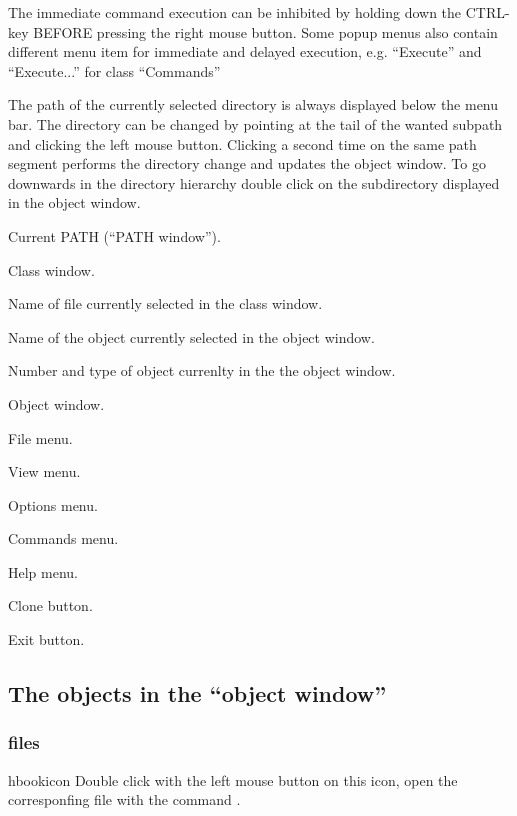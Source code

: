    The immediate command execution can be inhibited by holding down the
   CTRL-key BEFORE pressing the right mouse button.  Some popup menus also
   contain different menu item for immediate and delayed execution, e.g.
   ``Execute'' and ``Execute...'' for class ``Commands''

   The path of the currently selected directory is always displayed below the
   menu bar.  The directory can be changed by pointing at the tail of the
   wanted subpath and clicking the left mouse button.  Clicking a second time
   on the same path segment performs the directory change and updates the
   object window.  To go downwards in the directory hierarchy double click on
   the subdirectory displayed in the object window.


\begin{EnumZB}
\item Current PATH (``PATH window'').
\item Class window.
\item Name of file currently selected in the class window.
\item Name of the object currently selected in the object window.
\item Number and type of object currenlty in the the object window.
\item Object window.
\end{EnumZB}

\begin{EnumZW}
\item File menu.
\item View menu.
\item Options menu.
\item Commands menu.
\item Help menu.
\item Clone button.
\item Exit button.
\end{EnumZW}

\subsection{The objects in the ``object window''}

\subsubsection{\HBOOK{} files}
\begin{ICON}{hbookicon}
Double click with the left mouse button on this icon, open the corresponfing
\HBOOK{} file with the command .
\end{ICON}

